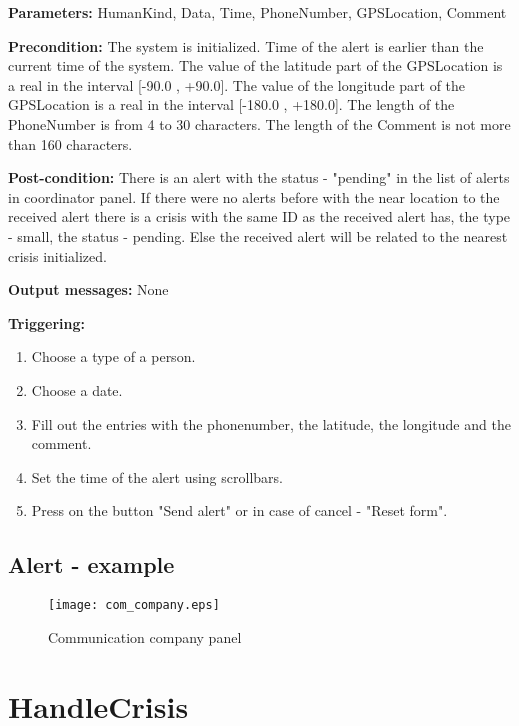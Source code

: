 \begin{description}
	\item \textbf{Parameters:} HumanKind, Data, Time, PhoneNumber, GPSLocation,
	Comment
	\item \textbf{Precondition:} The system is initialized. Time of the alert is
	earlier than the current time of the system. The value of the latitude part
	of the GPSLocation is a real in the interval [-90.0 , +90.0]. The value of the longitude part
	of the GPSLocation is a	real in the interval [-180.0 , +180.0]. The length of
	the PhoneNumber is from 4 to 30 characters. The length of the Comment is
	not more than 160 characters.
	\item \textbf{Post-condition:} There is an alert with the status - "pending" in
	the list of alerts in coordinator panel. If there were no alerts before with the
	near location to the received alert there is a crisis with
	the same ID as the received alert has, the type - small, the status - pending.
	Else the received alert will be related to the nearest crisis initialized. 
	\item \textbf{Output messages:} None
	
	\item \textbf{Triggering:}
	
	\begin{enumerate}
		\item Choose a type of a person.
		\item Choose a date.
		\item Fill out the entries with the phonenumber, the latitude, the longitude
		and the comment.
		\item Set the time of the alert using scrollbars.
		\item Press on the button "Send alert" or in case of cancel - "Reset form".
	\end{enumerate}
\end{description}

\subsection{Alert - example}

\begin{figure}
    \texttt{[image: com\_company.eps]}
	\caption{Communication company panel}
\end{figure}

\section{HandleCrisis}
\label{operation:HandleCrisis}

